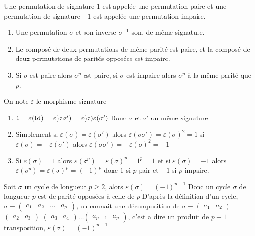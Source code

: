 \begin{defini}
    Une permutation de signature $1$ est appelée une permutation paire et une permutation de signature $-1$ est appelée une permutation impaire.
\end{defini}
\begin{prop}
    \begin{enumerate}
        \item Une permutation $\sigma$ et son inverse $\sigma^{-1}$ sont de même signature.
        \item Le composé de deux permutations de même parité est paire, et la composé de deux permutations de parités opposées est impaire.
        \item Si $\sigma$ est paire alors $\sigma^p$ est paire, si $\sigma$ est impaire alors $\sigma^p$ à la même parité que $p$.
    \end{enumerate}
    \tcblower
    On note $\varepsilon$ le morphisme signature
    \begin{enumerate}
        \item $1=\varepsilon(\operatorname{Id})=\varepsilon(\sigma \sigma')=\varepsilon(\sigma)\varepsilon(\sigma')$
        Donc $\sigma$ et $\sigma'$ on même signature 
        \item Simplement si $\varepsilon(\sigma)=\varepsilon(\sigma')$ alors $\varepsilon(\sigma \sigma')=\varepsilon(\sigma)^2=1$
        si $\varepsilon(\sigma)=-\varepsilon(\sigma')$ alors $\varepsilon(\sigma \sigma')=-\varepsilon(\sigma)^2=-1$
        \item Si $\varepsilon(\sigma)=1$ alors $\varepsilon(\sigma^p)=\varepsilon(\sigma)^p=1^p=1$ et si  $\varepsilon(\sigma)=-1$ alors $\varepsilon(\sigma^p)=\varepsilon(\sigma)^p=(-1)^p$ donc $1$ si $p$ pair et $-1$ si $p$ impaire.
    \end{enumerate}
\end{prop}
\begin{prop}
    Soit $\sigma$ un cycle de longueur $p\geq2$, alors $\varepsilon(\sigma)=(-1)^{p-1}$
    Donc un cycle $\sigma$ de longueur $p$ est de parité opposées à celle de $p$
    \tcblower
    D'après la définition d'un cycle, $\sigma=\begin{pmatrix}
        a_1 & a_2 & \dots & a_p
        \end{pmatrix}$, on connait une décomposition de $\sigma=\begin{pmatrix}
            a_1 & a_2
            \end{pmatrix}$$\begin{pmatrix}
                a_2 & a_3
                \end{pmatrix}$
                $\begin{pmatrix}
                    a_3 & a_4
                    \end{pmatrix}\dots$$\begin{pmatrix}
                        a_{p-1} & a_p
                        \end{pmatrix}$, c'est a dire un produit de $p-1$ transposition, $\varepsilon(\sigma)=(-1)^{p-1}$
\end{prop}
